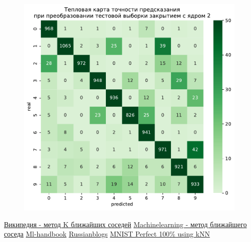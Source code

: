 \documentclass{article}
\begin{document}
\begin{figure}[h]
{\begin{minipage}{8cm}
		\end{minipage}
		\label{app6:morf3}
	}
	\subfigure
	{
	    \begin{minipage}{8cm}
	        \centering
	        \includegraphics[scale=0.35]{TASK1 test morf4.pdf}
	    \end{minipage}
	    \label{app6:morf4}
	}
\end{figure}




\newpage
{}
\begin{thebibliography}{}
     \href{https://ru.m.wikipedia.org/wiki/Метод_k-ближайших_соседей}{Википедия - метод K ближайших соседей}
     \href{http://www.machinelearning.ru/wiki/index.php?title=Метод_ближайшего_соседа}{Machinelearning - метод ближайшего соседа}
     \href{https://ml-handbook.ru/chapters/metric_based/intro}{Ml-handbook}
     \href{https://russianblogs.com/article/8928748181/}{Russianblogs}
     \href{https://www.kaggle.com/code/cdeotte/mnist-perfect-100-using-knn/notebook}{MNIST Perfect 100\% using kNN}
\end{thebibliography}
\end{document}
